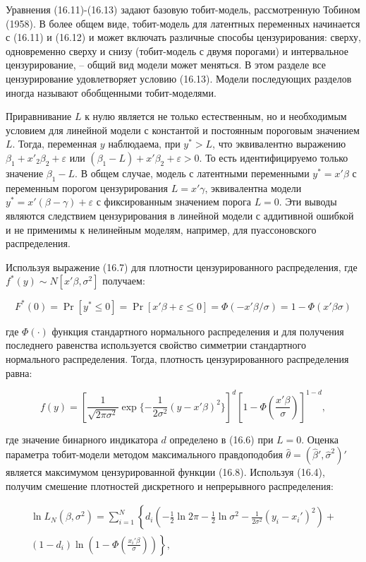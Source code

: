 Уравнения (16.11)-(16.13) задают базовую тобит-модель, рассмотренную Тобином (1958). В более общем виде, тобит-модель для латентных переменных начинается с (16.11) и (16.12) и может включать различные способы цензурирования: сверху, одновременно сверху и снизу (тобит-модель с двумя порогами) и интервальное цензурирование, -- общий вид модели может меняться. В этом разделе все цензурирование удовлетворяет условию (16.13). Модели последующих разделов иногда называют обобщенными тобит-моделями.

Приравнивание $L$ к нулю является не только естественным, но и необходимым условием для линейной модели с константой и постоянным пороговым значением $L$. Тогда, переменная $y$ наблюдаема, при $y^* >L$, что эквивалентно выражению $\beta_1+x'_2\beta_2+\varepsilon$ или $(\beta_1-L)+x'\beta_2+\varepsilon>0$. То есть идентифицируемо только значение $\beta_1 - L$. В общем случае, модель с латентными переменными $y^* =x'\beta$ с переменным порогом цензурирования $L=x'\gamma$, эквивалентна модели $y^* =x'(\beta-\gamma)+\varepsilon$ с фиксированным значением порога $L=0$. Эти выводы являются следствием цензурирования в линейной модели с аддитивной ошибкой и не применимы к нелинейным моделям, например, для пуассоновского распределения.

Используя выражение (16.7) для плотности цензурированного распределения, где $f^{*}(y) \sim N[x'\beta, \sigma^2]$ получаем:

\[
F^{*}(0)=\Pr[ y^* \leq0] =\Pr[ x'\beta+\varepsilon \leq 0] =\Phi(-x'\beta/\sigma) 
=1-\Phi(x'\beta\sigma)
\]

где $\Phi(\cdot )$ функция стандартного нормального распределения и для получения последнего равенства используется свойство симметрии стандартного нормального распределения. Тогда, плотность цензурированного распределения равна:

\begin{equation}
f(y)=
\left[\dfrac{1}{\sqrt{2\pi\sigma^{2}}}\exp \lbrace-\dfrac{1}{2\sigma^{2}}(y-x'\beta)^{2}\rbrace\right]^d
\left[1-\Phi\left(\dfrac{x'\beta}{\sigma}\right)\right]^{1-d},
\end{equation}

где значение бинарного индикатора $d$ определено в (16.6) при $L=0$. Оценка параметра тобит-модели методом максимального правдоподобия $\hat{\theta}=(\hat{\beta}',\hat{\sigma}^2)'$ является максимумом цензурированной функции (16.8). Используя (16.4), получим смешение плотностей дискретного и непрерывного распределения: 

\begin{multline}
\ln L_N(\beta,\sigma^2)=\sum_{i=1}^N
\left\lbrace d_i
\left(-\frac{1}{2}\ln 2\pi-\frac{1}{2}\ln{ \sigma^2-\frac{1}{2\sigma^2}(y_i-x_i')^2}\right)
+\right.\\
\left.
(1-d_i)\ln \left(1-\Phi
\left( \frac{x_i'\beta}{\sigma}\right)
\right)
\right\rbrace,
\end{multline}

